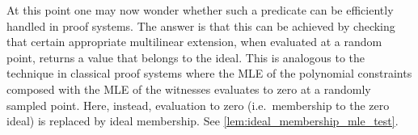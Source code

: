 At this point one may now wonder whether such a predicate can be efficiently handled in proof systems.  The answer is that this can be achieved by checking that certain appropriate multilinear extension, when evaluated at a random point, returns a value that belongs to the
ideal. This is analogous to the technique in classical proof systems where the MLE of the polynomial constraints composed with the MLE of the witnesses %
evaluates to zero at a randomly sampled point. Here, instead, evaluation to zero (i.e.\ membership to the zero ideal) is replaced by ideal membership. See \cref{lem:ideal_membership_mle_test}.



